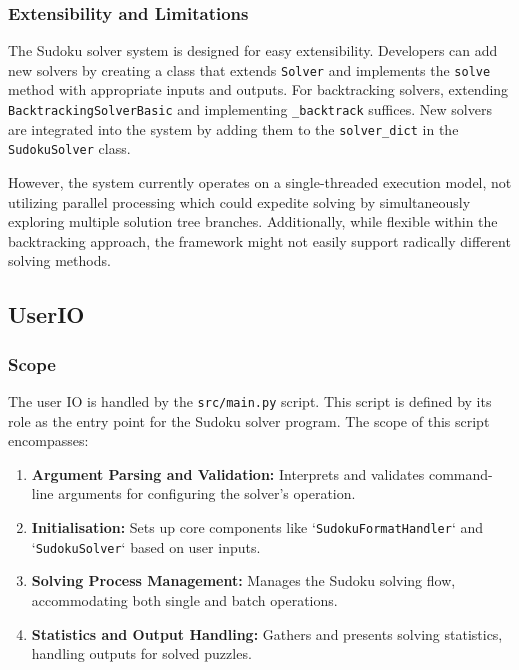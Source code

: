 \documentclass[11pt]{article}
\begin{document}
\begin{itemize}
\begin{figure}[h!]
\end{figure}

\subsubsection{Extensibility and Limitations}
The Sudoku solver system is designed for easy extensibility. Developers can add new solvers by creating a class that extends \texttt{Solver} and implements the \texttt{solve} method with appropriate inputs and outputs. For backtracking solvers, extending \texttt{BacktrackingSolverBasic} and implementing \texttt{\_backtrack} suffices. New solvers are integrated into the system by adding them to the \texttt{solver\_dict} in the \texttt{SudokuSolver} class.

However, the system currently operates on a single-threaded execution model, not utilizing parallel processing which could expedite solving by simultaneously exploring multiple solution tree branches. Additionally, while flexible within the backtracking approach, the framework might not easily support radically different solving methods.

\subsection{UserIO}
\subsubsection{Scope}
The user IO is handled by the \texttt{src/main.py} script. This script is defined by its role as the entry point for the Sudoku solver program. The scope of this script encompasses:

\begin{enumerate}
    \item \textbf{Argument Parsing and Validation:} Interprets and validates command-line arguments for configuring the solver's operation.
    \item \textbf{Initialisation:} Sets up core components like `\texttt{SudokuFormatHandler}` and `\texttt{SudokuSolver}` based on user inputs.
    \item \textbf{Solving Process Management:} Manages the Sudoku solving flow, accommodating both single and batch operations.
    \item \textbf{Statistics and Output Handling:} Gathers and presents solving statistics, handling outputs for solved puzzles.
\end{enumerate}


\end{itemize}
\end{document}
